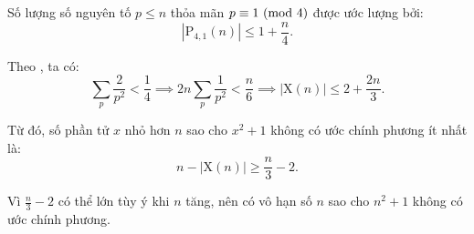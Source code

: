 \documentclass[../08-quadratic-residues.tex]{subfiles}
\begin{document}
\begin{soln}
    Số lượng số nguyên tố \( p \leq n \) thỏa mãn \( p \equiv 1 \ (\mathrm{mod}\ 4) \) được ước lượng bởi:
    \[
        |\text{P}_{4,1}(n)| \leq 1 + \frac{n}{4}.
    \]

    Theo , ta có:
    \[
        \sum_{p} \frac{2}{p^2} < \frac{1}{4} \implies 2n \sum_{p} \frac{1}{p^2} < \frac{n}{6} \implies |\text{X}(n)| \leq 2 + \frac{2n}{3}.
    \]
    
    Từ đó, số phần tử \( x \) nhỏ hơn \( n \) sao cho \( x^2 + 1 \) không có ước chính phương ít nhất là:
    \[
        n - |\text{X}(n)| \geq \frac{n}{3} - 2.
    \]

    Vì \( \frac{n}{3} - 2 \) có thể lớn tùy ý khi \( n \) tăng, nên có vô hạn số \( n \) sao cho \( n^2 + 1 \) không có ước chính phương.
\end{soln}

\end{document}

